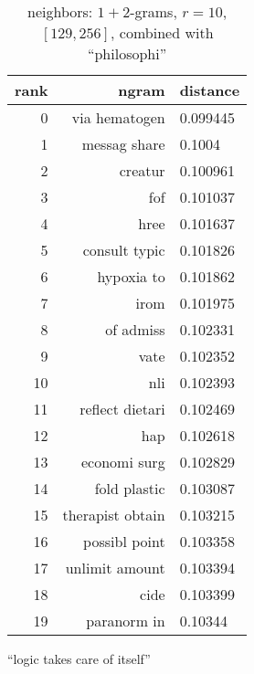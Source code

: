 \begin{table}[ht]
\begin{subtable}[t]{.45\textwidth}
\begin{tabularx}{\textwidth}{r R l}
            \toprule
            rank & ngram & distance\\
            \midrule
            \num{0} & via hematogen & \num{0.099445}\\
            \num{1} & messag share & \num{0.1004}\\
            \num{2} & creatur & \num{0.100961}\\
            \num{3} & fof & \num{0.101037}\\
            \num{4} & hree & \num{0.101637}\\
            \num{5} & consult typic & \num{0.101826}\\
            \midrule
            \num{6} & hypoxia to & \num{0.101862}\\
            \num{7} & irom & \num{0.101975}\\
            \num{8} & of admiss & \num{0.102331}\\
            \num{9} & vate & \num{0.102352}\\
            \num{10} & nli & \num{0.102393}\\
            \num{11} & reflect dietari & \num{0.102469}\\
            \num{12} & hap & \num{0.102618}\\
            \num{13} & economi surg & \num{0.102829}\\
            \num{14} & fold plastic & \num{0.103087}\\
            \num{15} & therapist obtain & \num{0.103215}\\
            \num{16} & possibl point & \num{0.103358}\\
            \num{17} & unlimit amount & \num{0.103394}\\
            \num{18} & cide & \num{0.103399}\\
            \num{19} & paranorm in & \num{0.10344}\\
            \bottomrule
        \end{tabularx}
        \caption{\enquote{logic takes care of itself}}
        \label{tab:ranking_chance2_2}
    \end{subtable}
    \caption{neighbors: $1+2$-grams, $r = 10$, $[129,256]$, combined with \enquote{philosophi}}
    \label{tab:ranking_chance2}
\end{table}

